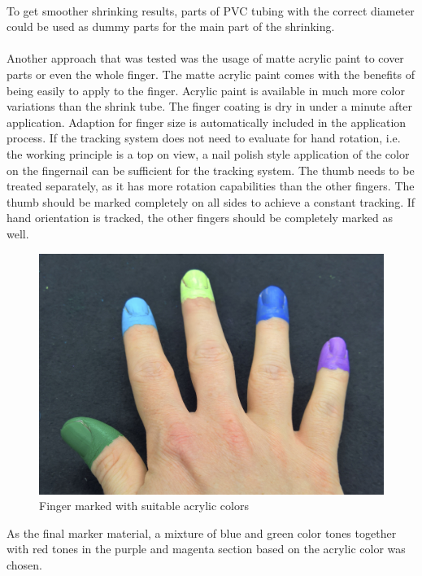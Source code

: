 \\To get smoother shrinking results, parts of PVC tubing with the correct diameter could be used as dummy parts for the main part of the shrinking.\\
\\Another approach that was tested was the usage of matte acrylic paint to cover parts or even the whole finger. The matte acrylic paint comes with the benefits of being easily to apply to the finger. Acrylic paint is available in much more color variations than the shrink tube. The finger coating is dry in under a minute after application. Adaption for finger size is automatically included in the application process. If the tracking system does not need to evaluate for hand rotation, i.e. the working principle is a top on view, a nail polish style application of the color on the fingernail can be sufficient for the tracking system. The thumb needs to be treated separately, as it has more rotation capabilities than the other fingers. The thumb should be marked completely on all sides to achieve a constant tracking. If hand orientation is tracked, the other fingers should be completely marked as well.
\begin{figure}[H]
\centering
\includegraphics[width=\textwidth/2]{images/final_finger_markers.jpg}
\caption{Finger marked with suitable acrylic colors}
\label{img:final_markers}
\end{figure}
As the final marker material, a mixture of blue and green color tones together with red tones in the purple and magenta section based on the acrylic color was chosen.
